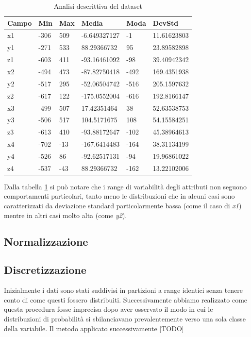 \documentclass[12pt]{article}
\begin{document}
\begin{table}[h]
	\caption{Analisi descrittiva del dataset}\label{tab:analytics}
	\begin{tabular}{|l|l|l|l|l|l|}
		\hline
		Campo & Min & Max & Media & Moda & DevStd \\
		\hline
		x1 & -306 & 509 & -6.649327127 & -1 & 11.61623803 \\
		y1 & -271 & 533 & 88.29366732 & 95 & 23.89582898 \\
		z1 & -603 & 411 & -93.16461092 & -98 & 39.40942342 \\
		x2 & -494 & 473 & -87.82750418 & -492 & 169.4351938 \\
		y2 & -517 & 295 & -52.06504742 & -516 & 205.1597632 \\
		z2 & -617 & 122 & -175.0552004 & -616 & 192.8166147 \\
		x3 & -499 & 507 & 17.42351464 & 38 & 52.63538753 \\
		y3 & -506 & 517 & 104.5171675 & 108 & 54.15584251 \\
		z3 & -613 & 410 & -93.88172647 & -102 & 45.38964613 \\
		x4 & -702 & -13 & -167.6414483 & -164 & 38.31134199 \\
		y4 & -526 & 86 & -92.62517131 & -94 & 19.96861022 \\
		z4 & -537 & -43 & 88.29366732 & -162 & 13.22102006 \\
		
		\hline
	\end{tabular}
\end{table}

Dalla tabella \ref{tab:analytics} si può notare che i range di variabilità degli attributi non seguono comportamenti particolari, tanto meno le distribuzioni che in alcuni casi sono caratterizzati da deviazione standard particolarmente bassa (come il caso di \emph{x1}) mentre in altri casi molto alta (come \emph{y2}).

\subsection{Normalizzazione}

\subsection{Discretizzazione}
Inizialmente i dati sono stati suddivisi in partizioni a range identici senza tenere conto di come questi fossero distribuiti. Successivamente abbiamo realizzato come questa procedura fosse imprecisa dopo aver osservato il modo in cui le distribuzioni di probabilità si sbilanciavano prevalentemente verso una sola classe della variabile. \newline
Il metodo applicato successivamente [TODO]
\end{document}
